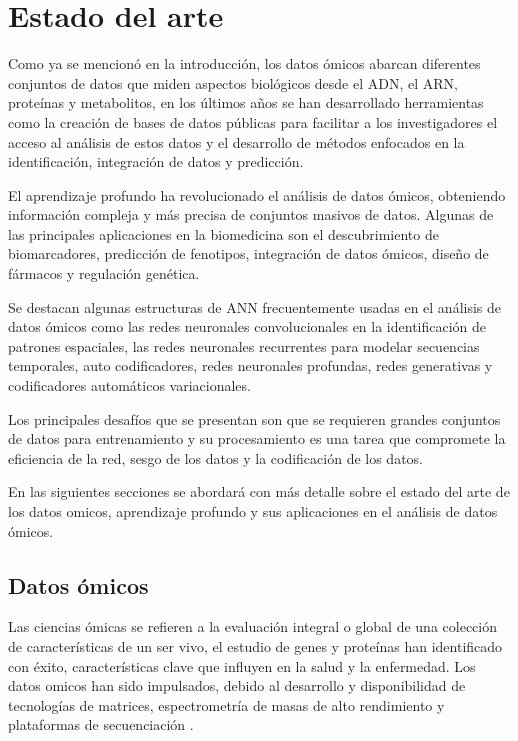 \section{Estado del arte}


Como ya se mencionó en la introducción, los datos ómicos abarcan diferentes conjuntos de datos que miden aspectos biológicos desde el ADN, el ARN, proteínas y metabolitos, en los últimos años se han desarrollado herramientas como la creación de bases de datos públicas para facilitar a los investigadores el acceso al análisis de estos datos y el desarrollo de métodos enfocados en la identificación, integración de datos y predicción.

El aprendizaje profundo ha revolucionado el análisis de datos ómicos, obteniendo información compleja y más precisa de conjuntos masivos de datos. Algunas de las principales aplicaciones en la biomedicina son el descubrimiento de biomarcadores, predicción de fenotipos, integración de datos ómicos, diseño de fármacos y regulación genética.

Se destacan algunas estructuras de ANN frecuentemente usadas en el análisis de datos ómicos como las redes neuronales convolucionales en la identificación de patrones espaciales, las redes neuronales recurrentes para modelar secuencias temporales, auto codificadores, redes neuronales profundas, redes generativas y codificadores automáticos variacionales.

Los principales desafíos que se presentan son que se requieren grandes conjuntos de datos para entrenamiento y su procesamiento es una tarea que compromete la eficiencia de la red, sesgo de los datos y la codificación de los datos.

En las siguientes secciones se abordará con más detalle sobre el estado del arte de los datos omicos, aprendizaje profundo y sus aplicaciones en el análisis de datos ómicos.

\subsection{Datos ómicos}

Las ciencias ómicas se refieren a la evaluación integral o global de una colección de características de un ser vivo, el estudio de genes y proteínas han identificado con éxito, características clave que influyen en la salud y la enfermedad. Los datos omicos han sido impulsados, debido al desarrollo y disponibilidad de tecnologías de matrices, espectrometría de masas de alto rendimiento y plataformas de secuenciación \citep{hasin2017multi}.

